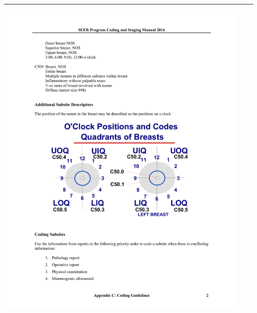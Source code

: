 \begin{table}[!htb]
\begin{threeparttable}
\begin{tabular}{p{2.5cm} p{7.5cm} p{6.5cm}}
			\begin{center}\includegraphics[width=0.75\linewidth]{IMAGENES/icd_Breast_Clock_Position}\end{center}
			\\ \hline
			
								
		\end{tabular}
	\end{threeparttable}
\end{table}

